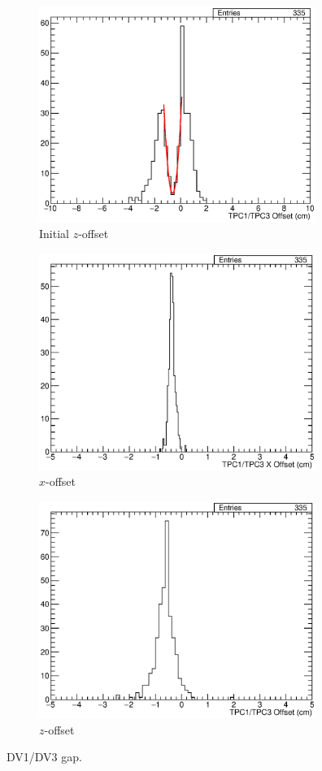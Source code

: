 \begin{figure}
  \centering
  \begin{subfigure}[t]{\linewidth}
    \centering
    \includegraphics[width=9cm]{TPC1TPC3Gap.eps}
    \caption{Initial $z$-offset}
    \label{fig:AppendixTPC1TPC3Gap}
  \end{subfigure}
  \vfill
  \begin{subfigure}[t]{\linewidth}
    \centering
    \includegraphics[width=9cm]{TPC1TPC3XOff.eps}
    \caption{$x$-offset}
    \label{fig:AppendixTPC1TPC3XOff}
  \end{subfigure}
  \vfill
  \begin{subfigure}[t]{\linewidth}
    \centering
    \includegraphics[width=9cm]{TPC1TPC3ZOff.eps}
    \caption{$z$-offset}
    \label{fig:AppendixTPC1TPC3ZOff}
  \end{subfigure}
  \caption{DV1/DV3 gap.}
  \label{fig:AppendixTPC1TPC3}
\end{figure}


